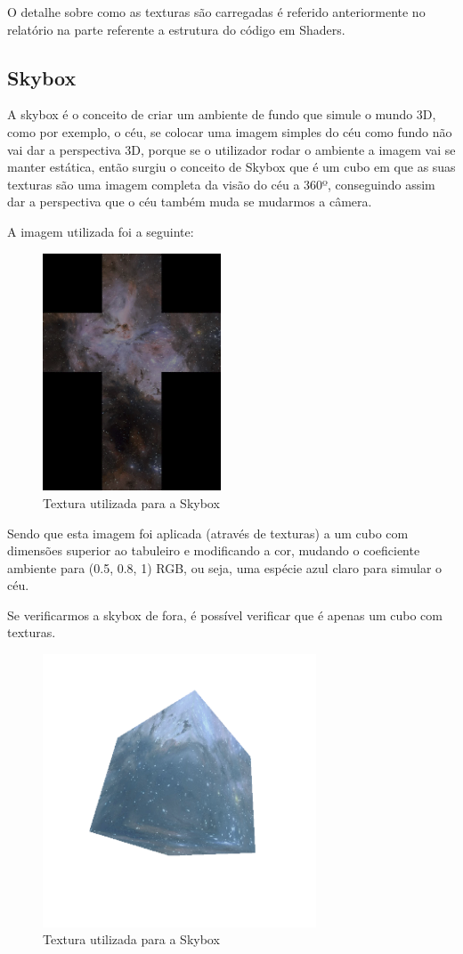 \documentclass[portugues,final]{revdetua}
\begin{document}
O detalhe sobre como as texturas são carregadas é referido anteriormente no relatório na parte referente a estrutura do código em Shaders.

\subsection{Skybox}

A skybox é o conceito de criar um ambiente de fundo que simule o mundo 3D, como por exemplo, o céu, se colocar uma imagem simples do céu como fundo não vai dar a perspectiva 3D, porque se o utilizador rodar o ambiente a imagem vai se manter estática, então surgiu o conceito de Skybox que é um cubo em que as suas texturas são uma imagem completa da visão do céu a 360º, conseguindo assim dar a perspectiva que o céu também muda se mudarmos a câmera.

A imagem utilizada foi a seguinte:

\begin{figure}[H]
\centerline{\includegraphics[width=150pt]{images/skybox.png}}
\caption{Textura utilizada para a Skybox}
\label{img:complete}
\end{figure}

Sendo que esta imagem foi aplicada (através de texturas) a um cubo com dimensões superior ao tabuleiro e modificando a cor, mudando o coeficiente ambiente para (0.5, 0.8, 1) RGB, ou seja, uma espécie azul claro para simular o céu.

Se verificarmos a skybox de fora, é possível verificar que é apenas um cubo com texturas.

\begin{figure}[H]
\centerline{\includegraphics[width=230pt]{images/skybox_cube.png}}
\caption{Textura utilizada para a Skybox}
\label{img:complete}
\end{figure}
\end{document}
